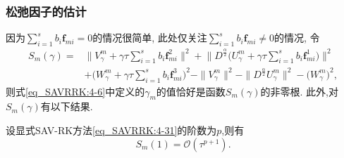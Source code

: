 \documentclass[aspectratio=169]{beamer}
\numberwithin{theorem}{section} %
\begin{document}
\begin{frame}\frametitle{松弛因子的估计}
	因为$\sum\limits_{i=1}^s b_i \bm{f}_{m i} = 0$的情况很简单, 此处仅关注$\sum\limits_{i=1}^s b_i \bm{f}_{m i} \neq 0$的情况,
	令
	\begin{equation}
	\begin{aligned}\label{eq_SAVRRK:sm}
	S_m(\gamma)=&\big\|V_\gamma^m+\gamma \tau \sum\limits_{i=1}^s b_i \bm{f}_{m i}^2\big\|^2 + \big\|D^\frac{\alpha}{2} \big(U_\gamma^m+\gamma \tau \sum\limits_{i=1}^s b_i \bm{f}_{m i}^1\big)\big\|^2\\
	&+\big(W_\gamma^m+\gamma \tau \sum\limits_{i=1}^s b_i \bm{f}_{m i}^3\big)^2-\|V_\gamma^{m}\|^2 - \|D^\frac{\alpha}{2} U_\gamma^{m}\|^2-\big(W_\gamma^{m}\big)^2,
	\end{aligned}
	\end{equation}
	则式\eqref{eq_SAVRRK:4-6}中定义的$\gamma_m$的值恰好是函数$S_m(\gamma)$的非零根.
	此外,对$S_m(\gamma)$有以下结果.
	\begin{lemma}\label{lem_SAVRRK:5_1}
	设显式SAV-RK方法\eqref{eq_SAVRRK:4-31}的阶数为$p$,则有
	\begin{equation}
	S_m(1)=\mathcal{O}(\tau^{p+1}).
	\end{equation}
	\end{lemma}
\end{frame}
\end{document}
